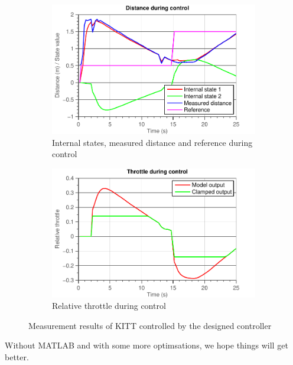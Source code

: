\documentclass[11pt,titlepage]{report}
\begin{document}
\begin{figure}[H]
	\begin{subfigure}{.5\textwidth}
		\centering
		\includegraphics[width=\linewidth]{resource/measurement-states.pdf}
		\caption{Internal states, measured distance and reference during control}
	\end{subfigure}
	\begin{subfigure}{.5\textwidth}
		\centering
		\includegraphics[width=\linewidth]{resource/measurement-drive.pdf}
		\caption{Relative throttle during control}
	\end{subfigure}
	\caption{Measurement results of KITT controlled by the designed controller}
	\label{fig:ass2-kitt-controlled}
\end{figure}

Without MATLAB and with some more optimsations, we hope things will get better.
\end{document}
